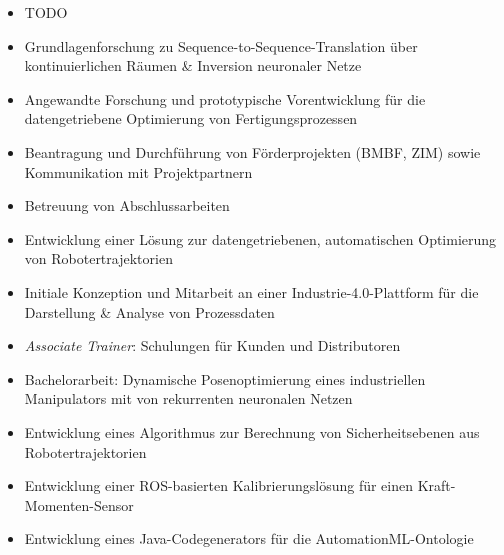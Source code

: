 \begin{itemize}
  \item TODO
\end{itemize}

\begin{itemize}
  \item Grundlagenforschung zu Sequence-to-Sequence-Translation über kontinuierlichen Räumen \& Inversion neuronaler Netze
  \item Angewandte Forschung und prototypische Vorentwicklung für die datengetriebene Optimierung von Fertigungsprozessen
  \item Beantragung und Durchführung von Förderprojekten (BMBF, ZIM) sowie Kommunikation mit Projektpartnern
  \item Betreuung von Abschlussarbeiten
\end{itemize}

\begin{itemize}
  \item Entwicklung einer Lösung zur datengetriebenen, automatischen Optimierung von Robotertrajektorien
  \item Initiale Konzeption und Mitarbeit an einer Industrie-4.0-Plattform für die Darstellung \& Analyse von Prozessdaten
  \item \textit{Associate Trainer}: Schulungen für Kunden und Distributoren
\end{itemize}

\begin{itemize}  
  \item Bachelorarbeit: Dynamische Posenoptimierung eines industriellen Manipulators mit von rekurrenten neuronalen Netzen
  \item Entwicklung eines Algorithmus zur Berechnung von Sicherheitsebenen aus Robotertrajektorien
\end{itemize}

\divider

\begin{itemize}  
  \item Entwicklung einer ROS-basierten Kalibrierungslösung für einen Kraft-Momenten-Sensor
  \item Entwicklung eines Java-Codegenerators für die AutomationML-Ontologie
\end{itemize}

